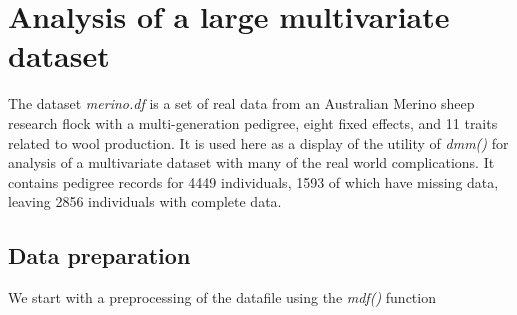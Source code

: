 \documentclass[titlepage]{article}  %
\begin{document}
\clearpage
\section{Analysis of a large multivariate dataset} 
	The dataset {\em merino.df} is a set of real data from an Australian Merino sheep research flock with a multi-generation pedigree, eight fixed effects, and 11 traits related to wool production.
It is used here as a display of the utility of {\em dmm()} for analysis of a multivariate dataset with many of the real world complications. It contains  pedigree records for 4449 individuals, 1593 of which have missing data, leaving 2856 individuals with complete data.

\subsection{Data preparation}
We start with a  preprocessing of the datafile using the {\em mdf()} function
\end{document}
